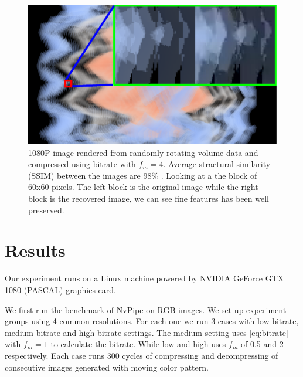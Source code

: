 \documentclass[review]{vgtc}                 %
\begin{document}
\begin{figure}[h]
  \centering
  \includegraphics[width=\columnwidth]{quality.eps}
  \caption{1080P image rendered from randomly rotating volume data and compressed using bitrate with \(f_m=4\). Average stractural similarity (SSIM) between the images are 98\% \cite{wang2004image}. Looking at a the block of 60x60 pixels. The left block is the original image while the right block is the recovered image, we can see fine features has been well preserved. }
  \label{fig:quality}
\end{figure}

\section{Results}

Our experiment runs on a Linux machine powered by NVIDIA GeForce GTX 1080 (PASCAL) graphics card.

We first run the benchmark of NvPipe on RGB images. We set up experiment groups using 4 common resolutions. For each one we run 3 cases with low bitrate, medium bitrate and high bitrate settings. The medium setting uses \cref{eq:bitrate} with \(f_m = 1\) to calculate the bitrate. While low and high uses \(f_m\) of 0.5 and 2 respectively. Each case runs 300 cycles of compressing and decompressing of consecutive images generated with moving color pattern.
\end{document}
